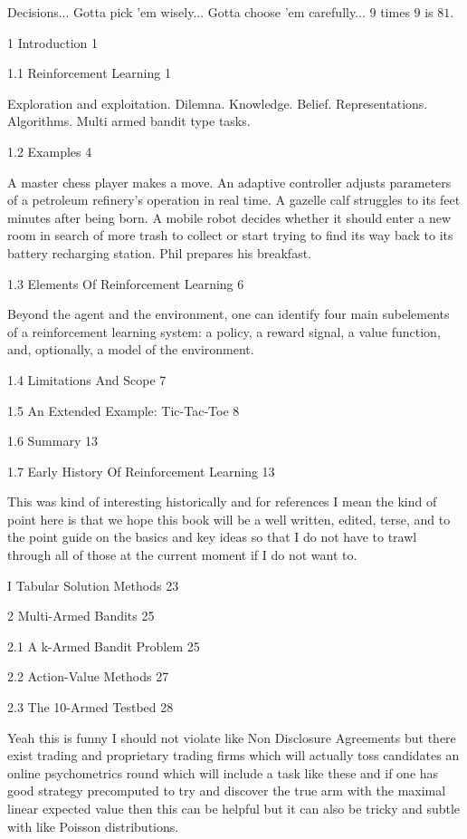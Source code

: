 Decisions... Gotta pick 'em wisely... Gotta choose 'em carefully... $9$ times $9$ is $81$.

1 Introduction 1



1.1 Reinforcement Learning 1

Exploration and exploitation. Dilemna. Knowledge. Belief. Representations. Algorithms. Multi armed bandit type tasks.

1.2 Examples 4

A master chess player makes a move. An adaptive controller adjusts parameters of a petroleum refinery's operation in real time. A gazelle calf struggles to its feet minutes after being born. A mobile robot decides whether it should enter a new room in search of more trash to collect or start trying to find its way back to its battery recharging station. Phil prepares his breakfast.

1.3 Elements Of Reinforcement Learning 6

Beyond the agent and the environment, one can identify four main subelements of a reinforcement learning system: a policy, a reward signal, a value function, and, optionally, a model of the environment.

1.4 Limitations And Scope 7



1.5 An Extended Example: Tic-Tac-Toe 8



1.6 Summary 13



1.7 Early History Of Reinforcement Learning 13

This was kind of interesting historically and for references I mean the kind of point here is that we hope this book will be a well written, edited, terse, and to the point guide on the basics and key ideas so that I do not have to trawl through all of those at the current moment if I do not want to.

I Tabular Solution Methods 23



2 Multi-Armed Bandits 25



2.1 A k-Armed Bandit Problem 25



2.2 Action-Value Methods 27



2.3 The 10-Armed Testbed 28

Yeah this is funny I should not violate like Non Disclosure Agreements but there exist trading and proprietary trading firms which will actually toss candidates an online psychometrics round which will include a task like these and if one has good strategy precomputed to try and discover the true arm with the maximal linear expected value then this can be helpful but it can also be tricky and subtle with like Poisson distributions.

